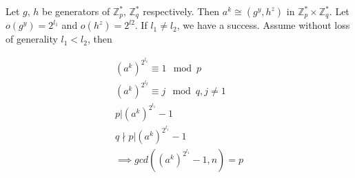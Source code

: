 \documentclass{article}
\begin{document}
Let $g$, $h$ be generators of $\mathbb{Z}_{p}^{*}$, $\mathbb{Z}_{q}^{*}$ respectively. Then $a^k \cong (g^y, h^z)$ in $\mathbb{Z}_{p}^{*} \times \mathbb{Z}_{q}^{*}$. Let $o(g^y)=2^{l_1}$ and $o(h^z)=2^{l2}$. If $l_1 \neq l_2$, we have a success. Assume without loss of generality $l_1 < l_2$, then

\begin{align*}
    (a^k)^{2^{l_1}} \equiv 1 \mod p \\
    (a^k)^{2^{l_2}} \equiv j \mod q, j \neq 1 \\
    p | (a^k)^{2^{l_1}} - 1 \\
    q \nmid p | (a^k)^{2^{l_1}} - 1 \\
    \implies gcd((a^k)^{2^{l_1}} - 1, n) = p 
\end{align*}
\end{document}
